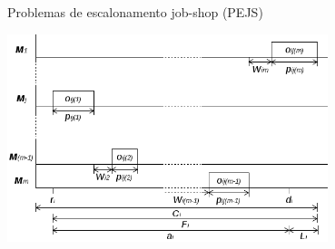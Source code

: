 \documentclass{beamer}
\begin{document}
\begin{frame}{Problemas de escalonamento job-shop (PEJS)}
\begin{center}
  \includegraphics[width=0.7\textwidth]{../imgs/gantt.png}
\end{center}
\end{frame}
\end{document}
